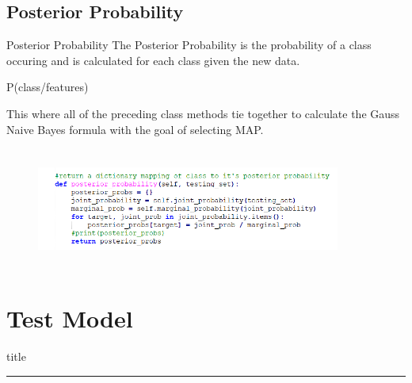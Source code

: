 \documentclass{beamer}
\begin{document}
\subsection{Posterior Probability}
    \begin{frame}{Posterior Probability}
        \hspace{0.5cm} The Posterior Probability is the probability of a class occuring and is calculated for each class given the new data.
        \begin{center}
            \textcolor[rgb]{1.0,0.0,0.0} {P(class/features)}\\
        \end{center}
        \hspace{0.5cm} This where all of the preceding class methods tie together to calculate the Gauss Naive Bayes formula with the goal of selecting MAP. \\
        \begin{center}
            \begin{figure}
                \begin{center}
                    \includegraphics[width = 10cm, height = 4cm]{Theme/images/posterior_probs.PNG}
                \end{center}
            \end{figure}
        \end{center}
    \end{frame}

\section{Test Model}
    \begin{frame}[plain]
        \vfill
      \centering
      \begin{beamercolorbox}[sep=8pt,center,shadow=true,rounded=true]{title}
        \insertsectionhead\par%
        \color{oxfordblue}\noindent\rule{10cm}{1pt} \\
        \LARGE{\faFileTextO}
      \end{beamercolorbox}
      \vfill
  \end{frame}
  
\end{document}
